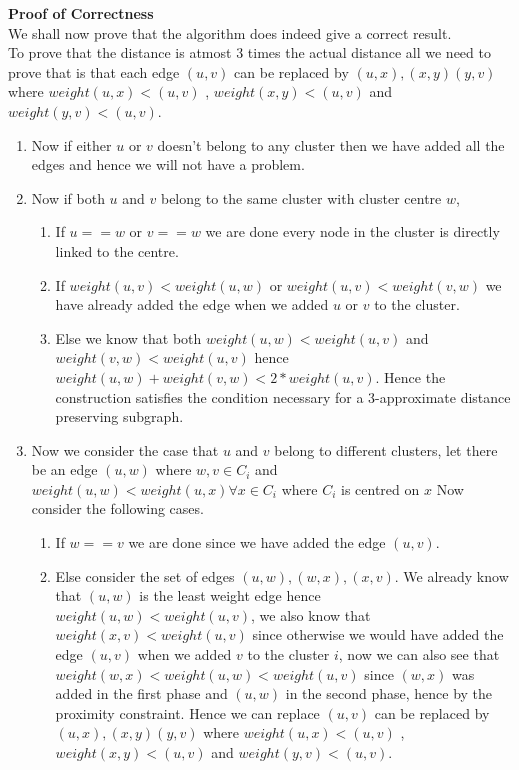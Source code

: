 \documentclass{assignment}
\begin{document}
\begin{problemlist}
\begin{problem}
\begin{answer}
\textbf{Proof of Correctness} \\
We shall now prove that the algorithm does indeed give a correct result.\\
To prove that the distance is atmost 3 times the actual distance all we need to prove that is that each edge $(u,v)$ can be replaced by $(u,x) ,(x,y) (y,v)$ where $weight (u,x) < (u,v)$ , $weight (x,y) < (u,v)$ and $weight (y,v) < (u,v)$. 
\begin{enumerate}
 \item Now if either $u$ or $v$ doesn't belong to any cluster then we have added all the edges and hence we will not have a problem.
 \item Now if both $u$ and $v$ belong to the same cluster with cluster centre $w$, 
 \begin{enumerate}
  \item If $u==w$ or $v==w$ we are done every node in the cluster is directly linked to the centre.
 \item If $weight(u,v) < weight(u,w)$ or $weight(u,v) < weight(v,w)$ we have already added the edge when we added $u$ or $v$ to the cluster. 
  \item Else we  know that both $weight(u,w) < weight(u,v)$ and $weight(v,w) < weight (u,v)$ hence $weight(u,w) +weight (v,w) < 2 * weight (u,v)$. Hence the construction satisfies the condition necessary for a 3-approximate distance preserving subgraph. 
\end{enumerate}
\item Now we consider the case that $u$ and $v$ belong to different clusters, let there be an edge $(u,w)$ where $w,v \in C_i$ and $weight(u,w) < weight (u,x) \forall x \in C_i$ where $C_i$ is centred on $x$ Now consider the following cases.   
\begin{enumerate}
 \item If $w == v$ we are done since we have added the edge $(u,v)$.
 \item Else consider the set of edges $(u,w), (w,x) , (x,v)$. We already know that $(u,w)$ is the least weight edge hence $weight(u,w)< weight(u,v)$, we also know that $weight(x,v) < weight(u,v)$ since otherwise we would have added the edge $(u,v)$ when we added $v$ to the cluster $i$, now we can also see that $weight(w,x) < weight(u,w) < weight (u,v)$ since $(w,x)$ was added in the first phase and $(u,w)$ in the second phase, hence by the proximity constraint. 
Hence we can replace $(u,v)$ can be replaced by $(u,x) ,(x,y) (y,v)$ where $weight (u,x) < (u,v)$ , $weight (x,y) < (u,v)$ and $weight (y,v) < (u,v)$. 
\end{enumerate}
\end{enumerate}


\end{answer}
\end{problem}
\end{problemlist}
\end{document}

